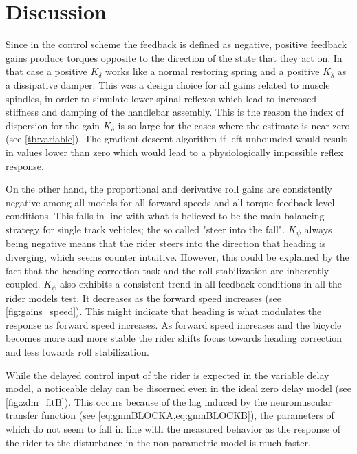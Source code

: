 \section{Discussion}
 
Since in the control scheme the feedback is defined as negative, positive feedback gains produce torques opposite to the direction of the state that they act on. In that case a  positive \ensuremath{K_\delta} works like a normal restoring spring and  a positive \ensuremath{K_{\dot{\delta}}} as a dissipative damper. This was a design choice for all gains related to muscle spindles, in order to simulate lower spinal reflexes which  lead to increased stiffness and damping of the handlebar assembly. This is the reason the index of dispersion for the gain \ensuremath{K_\delta} is so large for the cases where the estimate is near zero (see \cref{tb:variable}). The gradient descent algorithm if left unbounded would result in values lower than zero which would lead to a physiologically impossible reflex response.  

On the other hand, the proportional and derivative roll gains  are consistently negative among all models for all forward speeds and all torque feedback level conditions. This falls in line with what is believed to be the main balancing strategy for single track vehicles; the so called "steer into the fall". \ensuremath{K_\psi} always being negative means that the rider steers into the direction that heading is diverging, which  seems counter intuitive. However, this could be explained by the fact that the heading correction task and the roll stabilization are inherently coupled. \ensuremath{K_\psi} also exhibits a  consistent trend in all feedback conditions in all the rider models test. It decreases as the forward speed increases (see \cref{fig:gains_speed}). This might indicate that heading is what modulates the response as forward speed increases. As forward speed increases and the bicycle becomes more and more stable the rider shifts focus towards heading correction and less towards roll stabilization. 

While the delayed control input  of the rider is expected in the variable delay model, a noticeable delay can be discerned even in the ideal zero delay model (see \cref{fig:zdm_fitB}). This occurs because  of the lag induced by the neuromuscular transfer function (see \cref{eq:gnmBLOCKA,eq:gnmBLOCKB}), the parameters of which do not seem to fall in line with the measured behavior as the response of the rider to the disturbance in the non-parametric model is much faster. 

